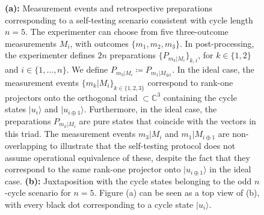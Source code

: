 \begin{figure}
    \caption{\textbf{(a):} Measurement events and retrospective preparations corresponding to a self-testing scenario consistent with cycle length $n=5$. The experimenter can choose from five three-outcome measurements $M_i$, with outcomes $\{m_1,m_2,m_3\}$. In post-processing, the experimenter defines $2n$ preparations $\{P_{m_k\vert M_i}\}_{k,i}$, for $k\in\{1,2\}$ and $i\in\{1,\dots,n\}$. We define $P_{m_3\vert M_i}\coloneqq P_{m_1\vert M_{\oplus 1}}$. In the ideal case, the measurement events $\{m_k\vert M_i\}_{k\in\{1,2,3\}}$ correspond to rank-one projectors onto the orthogonal triad $\subset \mathbb{C}^3$ containing the cycle states $\vert u_i\rangle$ and $\vert u_{i\oplus 1}\rangle$. Furthermore, in the ideal case, the preparations $P_{m_k\vert M_i}$ are pure states that coincide with the vectors in this triad. The measurement events $m_3\vert M_i$ and $m_1\vert M_{i\oplus 1}$ are non-overlapping to illustrate that the self-testing protocol does not assume operational equivalence of these, despite the fact that they correspond to the same rank-one projector onto $\vert u_{i\oplus 1}\rangle$ in the ideal case. \textbf{(b):} Juxtaposition with the cycle states belonging to the odd $n$-cycle scenario for $n=5$. Figure (a) can be seen as a top view of (b), with every black dot corresponding to a cycle state $\vert u_i\rangle$.}
\label{fig:ncycleselftesting}
\end{figure}

